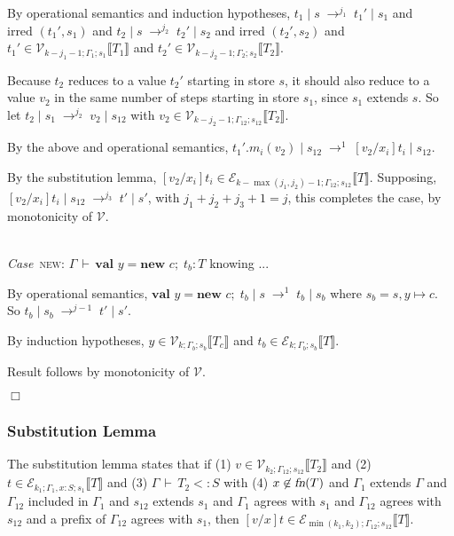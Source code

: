 \documentclass[9pt]{sigplanconf}
\newenvironment{myproof}{{\em Proof:}}{$\Box$}
\newcommand{\Case}{{\em Case\ }}
\newcommand{\ts}{\,\vdash\,}
\newcommand{\fn}{\mbox{\sl fn}}
\newcommand{\sub}{<:}
\newcommand{\subst}[3]{[#1/#2]#3}
\newcommand{\new}[3]{\textbf{val }#1 = \textbf{new }#2 ;\; #3}
\newcommand{\envplus}[1]{, #1}
\newcommand{\relv}[4]{\mathcal{V}_{#1;#2;#3}\llbracket#4\rrbracket}
\newcommand{\rele}[4]{\mathcal{E}_{#1;#2;#3}\llbracket#4\rrbracket}
\newcommand{\irred}[2]{\text{irred }(#1,#2)}
\newcommand{\reductionl}[5]{#1 \operatorname{|} #2 \;\rightarrow^{#5}\; #3 \operatorname{|} #4}
\begin{document}
\begin{myproof}
By operational semantics and induction hypotheses, $\reductionl {t_1}
s {t_1'} {s_1} {j_1}$ and $\irred {t_1'} {s_1}$ and $\reductionl {t_2}
{s} {t_2'} {s_2} {j_2}$ and $\irred {t_2'} {s_2}$ and ${t_1'} \in
\relv {k-j_1-1} {\Gamma_1} {s_1} {T_1}$ and ${t_2'} \in \relv
{k-j_2-1} {\Gamma_2} {s_2} {T_2}$.

Because $t_2$ reduces to a value $t_2'$ starting in store $s$, it
should also reduce to a value $v_2$ in the same number of steps
starting in store $s_1$, since $s_1$ extends $s$. So let $\reductionl
{t_2} {s_1} {v_2} {s_{12}} {j_2}$ with $v_2 \in \relv {k-j_2-1}
{\Gamma_{12}} {s_{12}} {T_2}$.

By the above and operational semantics, $\reductionl {t_1'.m_i(v_2)}
{s_{12}} {\subst {v_2} {x_i} {t_i}} {s_{12}} 1$.

By the substitution lemma, ${\subst {v_2} {x_i} {t_i}} \in \rele
{k-\max(j_1,j_2)-1} {\Gamma_{12}} {s_{12}} {T}$. Supposing,
$\reductionl {\subst {v_2} {x_i} {t_i}} {s_{12}} {t'} {s'} {j_3}$,
with $j_1 + j_2 + j_3 + 1 = j$, this completes the case, by
monotonicity of $\mathcal{V}$.

\ \\

\Case \textsc{new}: $\Gamma \ts \new y c {t_b} : T$ knowing ...

By operational semantics, $\reductionl {\new y c {t_b}} s {t_b} {s_b} 1$
where $s_b = s \envplus{y \mapsto c}$. So $\reductionl {t_b} {s_b} {t'}
{s'} {j-1}$.

By induction hypotheses, $y \in \relv k {\Gamma_b} {s_b} {T_c}$ and $t_b \in
\rele k {\Gamma_b} {s_b} {T}$.

Result follows by monotonicity of $\mathcal{V}$.

\end{myproof}

\subsubsection{Substitution Lemma}

The substitution lemma states that if (1) $v \in \relv {k_2}
{\Gamma_{12}} {s_{12}} {T_2}$ and (2) $t \in \rele {k_1} {\Gamma_1
  \envplus{{x} : S}} {s_1} T$ and (3) $\Gamma \ts {T_2} \sub S$ with
(4) $x \not\in \fn(T)$ and $\Gamma_1$ extends $\Gamma$ and
$\Gamma_{12}$ included in $\Gamma_1$ and $s_{12}$ extends $s_1$ and
$\Gamma_1$ agrees with $s_1$ and $\Gamma_{12}$ agrees with $s_{12}$
and a prefix of $\Gamma_{12}$ agrees with $s_1$, then $\subst {v} {x}
{t} \in \rele {\min(k_1,k_2)} {\Gamma_{12}} {s_{12}} T$.
\end{document}
